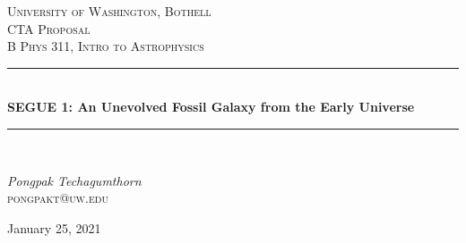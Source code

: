 \begin{titlepage} %
	\newcommand{\HRule}{\rule{\linewidth}{0.5mm}} %
	
	\center %
	
	
	\textsc{\LARGE University of Washington, Bothell}\\[1.5cm] %
	
	\textsc{\Large CTA Proposal}\\[0.5cm] %
	
	\textsc{\large B Phys 311, Intro to Astrophysics}\\[0.5cm] %
	
	
	\HRule\\[0.4cm]
	
	{\huge\bfseries SEGUE 1: An Unevolved Fossil Galaxy from the Early Universe}\\[0.4cm] %
	
	\HRule\\[1.5cm]
	
	
	\begin{minipage}{0.4\textwidth}
		\begin{flushleft}
			\large
			\textit{Pongpak Techagumthorn}\\
			\textsc{pongpakt@uw.edu} %
		\end{flushleft}
	\end{minipage}
	
	
	\vfill\vfill\vfill %
	
	{\large January 25, 2021} %
	
	\vfill %
	
\end{titlepage}

